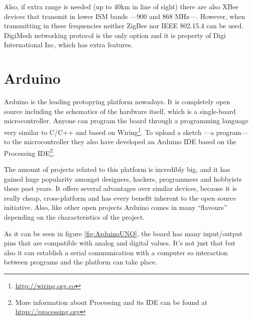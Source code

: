 Also, if extra range is needed (up to 40km in line of sight) there are also XBee\textregistered{} devices that transmit in lower ISM bands ---900 and 868 MHz---. However, when transmitting in these frequencies neither ZigBee nor IEEE 802.15.4 can be used. DigiMesh\texttrademark{} networking protocol is the only option and it is property of Digi International Inc, which has extra features.



\section{Arduino}

Arduino is the leading protopying platform nowadays. It is completely open source including the schematics of the hardware itself, which is a single-board microcontroller. Anyone can program the board through a programming language very similar to C/C++ and based on Wiring\footnote{\url{http://wiring.org.co}}. To upload a sketch ---a program--- to the microcontroller they also have developed an Arduino IDE based on the Processing IDE\footnote{More information about Processing and its IDE can be found at \url{htpp://processing.org}}.

The amount of projects related to this platform is incredibly big, and it has gained huge popularity amongst designers, hackers, programmers and hobbyists these past years. It offers several advantages over similar devices, because it is really cheap, cross-platform and has every benefit inherent to the open source initiative. Also, like other open projects Arduino comes in many ``flavours'' depending on the characteristics of the project.

As it can be seen in figure \ref{fig:ArduinoUNO}, the board has many input/output pins that are compatible with analog and digital values. It's not just that but also it can establish a serial communication with a computer so interaction between programs and the platform can take place.


